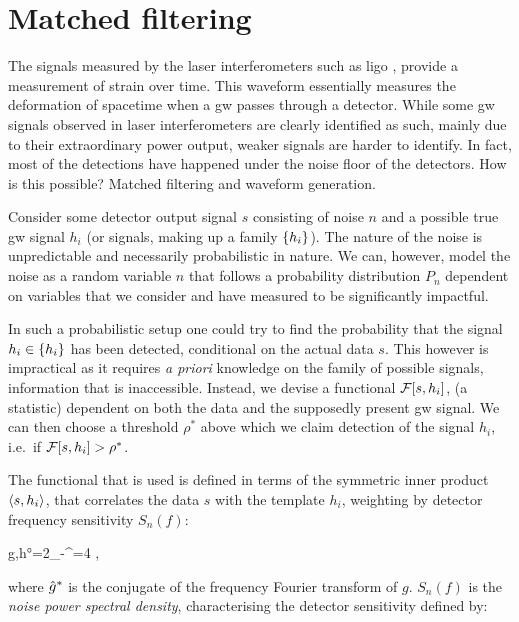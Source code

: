 \documentclass[
  11pt,
  a4paper,
  DIV=11,
  numbers=noendperiod,
  oneside]{scrreprt}
\let\[\relax \let\]\relax %
\DeclareRobustCommand{\[}{\begin{equation}}
\DeclareRobustCommand{\]}{\end{equation}}
\begin{document}
\hypertarget{matched-filtering}{%
\section{Matched filtering}\label{matched-filtering}}

The signals measured by the laser interferometers such as \gls{ligo} ,
provide a measurement of strain over time. This waveform essentially
measures the deformation of spacetime when a \gls{gw} passes through a
detector. While some \gls{gw} signals observed in laser interferometers
are clearly identified as such, mainly due to their extraordinary power
output, weaker signals are harder to identify. In fact, most of the
detections have happened under the noise floor of the detectors. How is
this possible? Matched filtering and waveform generation.

Consider some detector output signal \(s\) consisting of noise \(n\) and
a possible true \gls{gw} signal \(h_i\) (or signals, making up a family
\(\brk{h_i}\)). The nature of the noise is unpredictable and necessarily
probabilistic in nature. We can, however, model the noise as a random
variable \(n\) that follows a probability distribution \(P_n\) dependent
on variables that we consider and have measured to be significantly
impactful.

In such a probabilistic setup one could try to find the probability that
the signal \(h_i\in \brk{h_i}\) has been detected, conditional on the
actual data \(s\). This however is impractical as it requires \emph{a
priori} knowledge on the family of possible signals, information that is
inaccessible. Instead, we devise a functional
\(\mathcal{F}\brc{s,h_i}\), (a statistic) dependent on both the data and
the supposedly present \gls{gw} signal. We can then choose a threshold
\(\rho^*\) above which we claim detection of the signal \(h_i\), i.e.~if
\(\mathcal{F}\brc{s,h_i}>\rho^*\).

The functional that is used is defined in terms of the symmetric inner
product \(\ang{s,h_i}\), that correlates the data \(s\) with the
template \(h_i\), weighting by detector frequency sensitivity
\(S_n(f)\):

\[\ang{g,h}=2\int\limits_{-\infty}^{\infty}=4 ,\]

where \(\conj{\ft{g}{2\pi}}\) is the conjugate of the frequency Fourier
transform of \(g\). \(S_n(f)\) is the \emph{noise power spectral
density}, characterising the detector sensitivity defined by:
\end{document}
